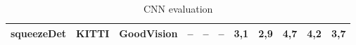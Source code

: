 \documentclass[twoside]{ctuthesis}
\theoremstyle{plain}
\theoremstyle{definition}
\theoremstyle{note}
\begin{document}
\begin{table}[hbt]
{\begin{tabular}{|c|c|c|c|c|c|c|c|c|c|c|}
\multirow{-3}{*}{squeezeDet}                             & \multirow{-2}{*}{KITTI}                                             & GoodVision                                                         & --                                                                     & --                                                                 & --                                                                        & 3,1                                                                & 2,9                                                                   & 4,7                                                                  & 4,2                                                                & 3,7                                                             \\ \hline
\end{tabular}
}
\caption{CNN evaluation}
\label{tab:cnn_evaluation}
\end{table}
\end{document}
